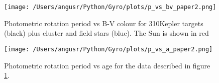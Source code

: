 \documentclass[10pt,preprint]{aastex}
\newcommand{\teff}{$T_{eff}~$}
\newcommand{\nastero}{310}
\newcommand{\ntotal}{597~}
\begin{document}



\begin{figure}[ht]
\begin{center}
\texttt{[image: /Users/angusr/Python/Gyro/plots/p\_vs\_bv\_paper2.png]}
\caption{Photometric rotation period vs B-V colour for \nastero Kepler targets (black) plus cluster and field stars (blue). The Sun is shown in red}
\label{fig:3d}
\end{center}
\end{figure}

\begin{figure}[ht]
\begin{center}
\texttt{[image: /Users/angusr/Python/Gyro/plots/p\_vs\_a\_paper2.png]}
\caption{Photometric rotation period vs age for the data described in figure \ref{fig:3d}.}
\label{fig:p_vs_a}
\end{center}
\end{figure}
\end{document}
